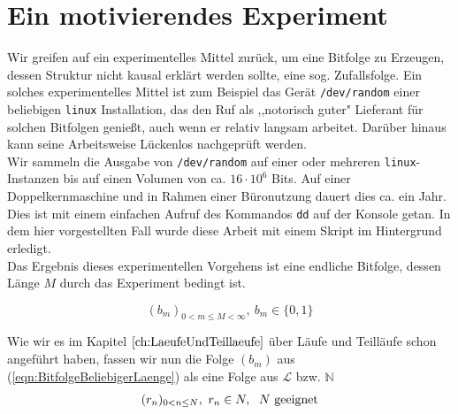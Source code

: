 \documentclass[11pt,oneside,a4paper]{scrreprt}
\begin{document}
\chapter{Ein motivierendes Experiment}\label{ch:MotivierendesExperiment}
Wir greifen auf ein experimentelles Mittel zurück, um eine Bitfolge zu Erzeugen, dessen Struktur nicht kausal erklärt werden sollte, eine sog. Zufallsfolge. Ein solches experimentelles Mittel ist zum Beispiel das Gerät {\tt /dev/random} einer beliebigen {\tt linux} Installation, das den Ruf als ,,notorisch guter" Lieferant für solchen Bitfolgen genießt, auch wenn er relativ langsam arbeitet. Darüber hinaus kann seine Arbeitsweise Lückenlos nachgeprüft werden.\\
Wir sammeln die Ausgabe von {\tt /dev/random} auf einer oder mehreren {\tt linux}-Instanzen bis auf einen Volumen von ca. $16\cdot 10^6$ Bits. Auf einer Doppelkernmaschine und in Rahmen einer Büronutzung dauert dies ca. ein Jahr. Dies ist mit einem einfachen Aufruf des Kommandos {\tt dd} auf der Konsole getan. In dem hier vorgestellten Fall wurde diese Arbeit mit einem Skript im Hintergrund erledigt.\\

\noindent Das Ergebnis dieses experimentellen Vorgehens ist eine endliche Bitfolge, dessen Länge $M$ durch das Experiment bedingt ist. 

\begin{equation}\label{eqn:BitfolgeBeliebigerLaenge}
(b_m)_{0<m\leq M<\infty},\ b_m\in\{0,1\}
\end{equation}

\noindent Wie wir es im Kapitel $\ref{ch:LaeufeUndTeillaeufe}$ über Läufe und Teilläufe schon angeführt haben, fassen wir nun die Folge $(b_m)$ aus (\ref{eqn:BitfolgeBeliebigerLaenge}) als eine Folge aus $\mathcal L$ bzw. $\mathbb N$
\begin{equation}\label{eqn:laeufefolgeBeliebigerLaengeL} 
(r_n)_{0<n\leq N},\ r_n\in\mathcal \mathbb N,\;\ N\text{ geeignet}
\end{equation} 
\end{document}
